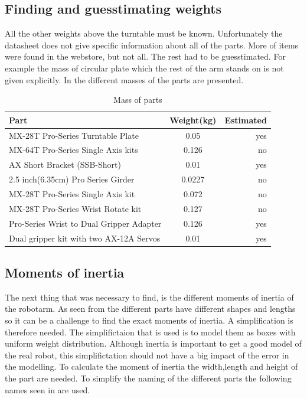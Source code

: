 \subsection{Finding and guesstimating weights}
All the other weights above the turntable must be known. Unfortunately the datasheet does not give specific information about all of the parts. More of items were found in the webstore, but not all. The rest had to be guesstimated. For example the mass of circular plate which the rest of the arm stands on is not given explicitly. In  the different masses of the parts are presented. 
\begin{table}[htbp]
\centering
\caption{Mass of parts}
\label{table:partmass}
    \begin{tabular}{l c r}
        \toprule
        Part  &  Weight(kg) & Estimated\\
        \midrule
        MX-28T Pro-Series Turntable Plate& 0.05 & yes\\
        MX-64T Pro-Series Single Axis kits& 0.126 & no\\
        AX Short Bracket (SSB-Short) & 0.01 & yes\\
        2.5 inch(6.35cm) Pro Series Girder & 0.0227 & no\\
        MX-28T Pro-Series Single Axis kit & 0.072 & no \\
        MX-28T Pro-Series Wrist Rotate kit & 0.127 & no\\
        Pro-Series Wrist to Dual Gripper Adapter & 0.126 & yes\\
        Dual gripper kit with two AX-12A Servos& 0.01 & yes\\
        \bottomrule
    \end{tabular}
\end{table}


\subsection{Moments of inertia}
The next thing that was necessary to find, is the different moments of inertia of the robotarm. As seen from  the different parts have different shapes and lengths so it can be a challenge to find the exact moments of inertia. A simplification is therefore needed. The simplifictaion that is used is to model them as boxes with uniform weight distribution. Although inertia is important to get a good model of the real robot, this simplifictation should not have a big impact of the error in the modelling. To calculate the moment of inertia the width,length and height of the part are needed. To simplify the naming of the different parts the following names seen in  are used.\\


